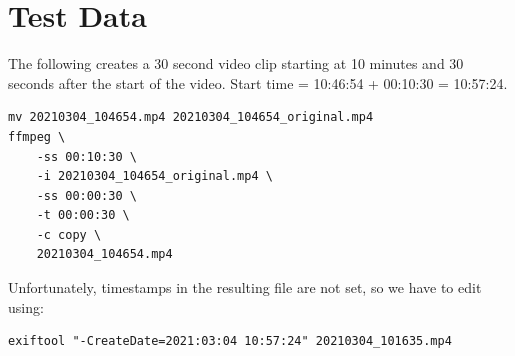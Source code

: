 \documentclass[12pt,letterpaper,english,bibliography=totocnumbered, abstract=on]{scrartcl}
\begin{document}
\cite{aubreymooreSetAutomatedRoadside2020}

\cite{onepanelinc.AIPipelineOperations2020}

\cite{onepanelinc.ScopeWorkObject2020}

\newpage
\section{Test Data}

The following creates a 30 second video clip starting at 10 minutes and 30 seconds after the start of the video.
Start time = 10:46:54 + 00:10:30 = 10:57:24.

\begin{verbatim}
mv 20210304_104654.mp4 20210304_104654_original.mp4
ffmpeg \
    -ss 00:10:30 \
    -i 20210304_104654_original.mp4 \
    -ss 00:00:30 \
    -t 00:00:30 \
    -c copy \
    20210304_104654.mp4
\end{verbatim}

Unfortunately, timestamps in the resulting file are not set, so we have to edit using:

\begin{verbatim}
exiftool "-CreateDate=2021:03:04 10:57:24" 20210304_101635.mp4
\end{verbatim}


\printbibliography	
\end{document}
